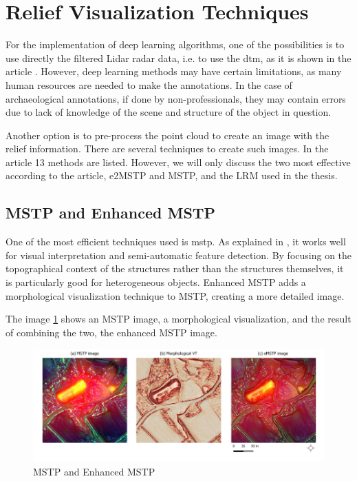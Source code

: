 \section{Relief Visualization Techniques}

For the implementation of deep learning algorithms, one of the possibilities is to use directly the filtered Lidar radar data, i.e. to use the \ac{dtm}, as it is shown in the article \cite{deeplearningRawLidarData}. However, deep learning methods may have certain limitations, as many human resources are needed to make the annotations. In the case of archaeological annotations, if done by non-professionals, they may contain errors due to lack of knowledge of the scene and structure of the object in question. 

Another option is to pre-process the point cloud to create an image with the relief information. There are several techniques to create such images. In the article\cite{reliefModel} 13 methods are listed. However, we will only discuss the two most effective according to the article, e2MSTP and MSTP, and the LRM used in the thesis.

\subsection{MSTP and Enhanced MSTP}
One of the most efficient techniques used is \ac{mstp}. As explained in \cite{mstp}, it works well for visual interpretation and semi-automatic feature detection. By focusing on the topographical context of the structures rather than the structures themselves, it is particularly good for heterogeneous objects. Enhanced MSTP adds a morphological visualization technique to MSTP, creating a more detailed image.

The image \ref{MSTP and Enhanced MSTP} shows an MSTP image, a morphological visualization, and the result of combining the two, the enhanced MSTP image.

\begin{figure}[H]
\centering
\includegraphics[width=\textwidth]{figs/mstp.png}
\caption[MSTP and Enhanced MSTP]{MSTP and Enhanced MSTP \cite{emstp}}
\label{MSTP and Enhanced MSTP}
\end{figure}

